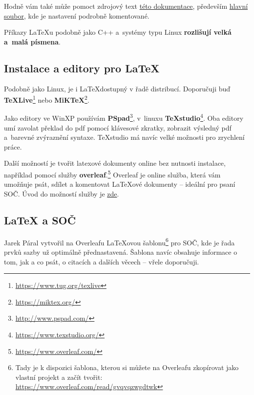 Hodně vám také může pomoct zdrojový text \href{https://github.com/RoboticsBrno/RoboticsBrno-guides/tree/RoboticsManual/RoboticsManual}{této dokumentace}, 
 především
 \href{https://github.com/RoboticsBrno/RoboticsBrno-guides/blob/RoboticsManual/RoboticsManual/_dokumentace.tex}{hlavní soubor},
 kde je nastavení podrobně komentované.  

Příkazy \LaTeX{}u podobně jako C++ a~systémy typu Linux {\bf rozlišují velká a~malá písmena}. 
 

\subsection{Instalace a editory pro \LaTeX}


Podobně jako Linux, je i \LaTeX dostupný v řadě distribucí. Doporučuji buď 
{\bf TeXLive}\footnote{\url{https://www.tug.org/texlive}} 
 nebo {\bf MiKTeX}\footnote{\url{https://miktex.org/}}.  
{\bf }

Jako editory ve WinXP používám {\bf PSpad}\footnote{\url{http://www.pspad.com/}}, v~linuxu {\bf TeXstudio}\footnote{\url{https://www.texstudio.org/}}.  
Oba editory umí zavolat překlad do pdf pomocí klávesové zkratky, zobrazit výsledný pdf a~barevné zvýraznění syntaxe. TeXstudio má navíc velké možnosti pro zrychlení práce.  


Další možností je tvořit latexové dokumenty online bez nutnosti instalace, například pomocí služby 
{\bf overleaf}.\footnote{\url{https://www.overleaf.com/}} Overleaf je online služba, která vám umožňuje psát, sdílet a komentovat LaTeXové dokumenty -- ideální pro psaní SOČ. Úvod do možností služby je 
\href{http://www.kutac.cz/blog/pocitace-a-internety/overleaf-online-latex-editor/}{zde}.  


\subsection{\LaTeX{} a SOČ}

Jarek Páral vytvořil na Overleafu LaTeXovou šablonu\footnote{Tady je k dispozici šablona, kterou si můžete na Overleafu zkopírovat jako vlastní projekt a začít tvořit: \url{https://www.overleaf.com/read/gvqvqzwgdtwk} }
 pro SOČ, kde je řada prvků sazby už optimálně přednastavená. 
 Šablona navíc obsahuje informace o tom, jak a co psát, o citacích a dalších věcech -- vřele doporučuji. 

